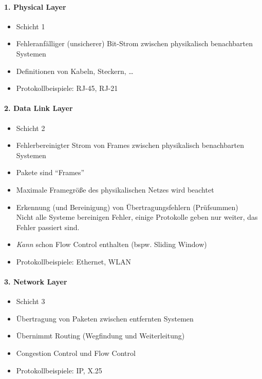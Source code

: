     \paragraph{1. Physical Layer}
        \begin{itemize}
        	\item Schicht 1
        	\item Fehleranfälliger (unsicherer) Bit-Strom zwischen physikalisch benachbarten Systemen
        	\item Definitionen von Kabeln, Steckern, \dots
        	\item Protokollbeispiele: RJ-45, RJ-21
        \end{itemize}
    
    \paragraph{2. Data Link Layer}
        \begin{itemize}
        	\item Schicht 2
        	\item Fehlerbereinigter Strom von Frames zwischen physikalisch benachbarten Systemen
        	\item Pakete sind \enquote{Frames}
        	\item Maximale Framegröße des physikalischen Netzes wird beachtet
        	\item Erkennung (und Bereinigung) von Übertragungsfehlern (Prüfsummen) \\ Nicht alle Systeme bereinigen Fehler, einige Protokolle geben nur weiter, das Fehler passiert sind.
        	\item \textit{Kann} schon Flow Control enthalten (bspw. Sliding Window)
        	\item Protokollbeispiele: Ethernet, WLAN
        \end{itemize}
    
    \paragraph{3. Network Layer}
        \begin{itemize}
        	\item Schicht 3
        	\item Übertragung von Paketen zwischen entfernten Systemen
        	\item Übernimmt Routing (Wegfindung und Weiterleitung)
        	\item Congestion Control und Flow Control
        	\item Protokollbeispiele: IP, X.25
        \end{itemize}
    
